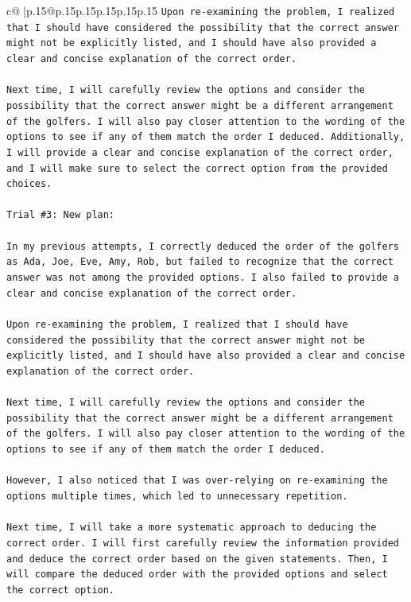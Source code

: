 \documentclass{article}
\begin{document}
{\begin{supertabular}{c@{$\;$}|p{.15\linewidth}@{}p{.15\linewidth}p{.15\linewidth}p{.15\linewidth}p{.15\linewidth}p{.15\linewidth}}
{{{\texttt{Upon re{-}examining the problem, I realized that I should have considered the possibility that the correct answer might not be explicitly listed, and I should have also provided a clear and concise explanation of the correct order. } \\
\\ 
\texttt{Next time, I will carefully review the options and consider the possibility that the correct answer might be a different arrangement of the golfers. I will also pay closer attention to the wording of the options to see if any of them match the order I deduced. Additionally, I will provide a clear and concise explanation of the correct order, and I will make sure to select the correct option from the provided choices.} \\
\\ 
\texttt{Trial \#3: New plan: } \\
\\ 
\texttt{In my previous attempts, I correctly deduced the order of the golfers as Ada, Joe, Eve, Amy, Rob, but failed to recognize that the correct answer was not among the provided options. I also failed to provide a clear and concise explanation of the correct order. } \\
\\ 
\texttt{Upon re{-}examining the problem, I realized that I should have considered the possibility that the correct answer might not be explicitly listed, and I should have also provided a clear and concise explanation of the correct order. } \\
\\ 
\texttt{Next time, I will carefully review the options and consider the possibility that the correct answer might be a different arrangement of the golfers. I will also pay closer attention to the wording of the options to see if any of them match the order I deduced. } \\
\\ 
\texttt{However, I also noticed that I was over{-}relying on re{-}examining the options multiple times, which led to unnecessary repetition. } \\
\\ 
\texttt{Next time, I will take a more systematic approach to deducing the correct order. I will first carefully review the information provided and deduce the correct order based on the given statements. Then, I will compare the deduced order with the provided options and select the correct option. } \\
\\ 
}}}
\end{supertabular}}
\end{document}
